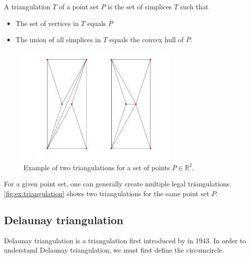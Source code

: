 \begin{definition}[Triangulation]
A triangulation $T$ of a point set $P$ is the set of simplices $T$ such that
\begin{itemize}
    \item The set of vertices in $T$ equals $P$
    \item The union of all simplices in $T$ equals the convex hull of $P$.
\end{itemize}
\end{definition}
\begin{figure}[h]
    \centering
    \includegraphics[width=0.7\textwidth]{report/Images/Theory/triangulation.png}
    \caption[Example of triangulation]{Example of two triangulations for a set of points $P \in \mathbb{R}^2$.}
    \label{fig:ex:triangulation}
\end{figure}

For a given point set, one can generally create multiple legal triangulations. \autoref{fig:ex:triangulation} shows two triangulations for the same point set $P$.


\subsection{Delaunay triangulation}
Delaunay triangulation is a triangulation first introduced by \textcite{delaunay_1943} in 1943. In order to understand Delaunay triangulation, we must first define the circumcircle.

